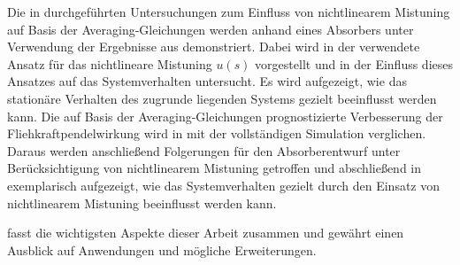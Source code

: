 Die in  durchgeführten Untersuchungen zum Einfluss von nichtlinearem
Mistuning auf Basis der Averaging-Gleichungen  werden anhand eines Absorbers unter Verwendung
der Ergebnisse aus  demonstriert.
Dabei wird in  der verwendete Ansatz für das
nichtlineare Mistuning $u(s)$ vorgestellt und in  der Einfluss dieses Ansatzes 
auf das Systemverhalten untersucht. Es wird aufgezeigt, wie das stationäre Verhalten des 
zugrunde liegenden Systems gezielt beeinflusst werden kann.
Die auf Basis der Averaging-Gleichungen prognostizierte Verbesserung der Fliehkraftpendelwirkung wird
in  mit der vollständigen Simulation verglichen.
%
Daraus werden anschließend Folgerungen für den Absorberentwurf unter Berücksichtigung von
nichtlinearem Mistuning getroffen und
abschließend in  exemplarisch aufgezeigt,
wie das Systemverhalten gezielt durch den Einsatz von nichtlinearem Mistuning beeinflusst werden kann.



 fasst die wichtigsten Aspekte dieser Arbeit zusammen und gewährt einen Ausblick
auf Anwendungen und mögliche Erweiterungen.
































